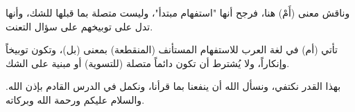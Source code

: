 وناقش  معنى (أَمْ) هنا، فرجح أنها "استفهام مبتدأ"، وليست متصلة بما قبلها للشك، وأنها تدل على توبيخهم على سؤال التعنت.

\begin{fawaid}
تأتي (أم) في لغة العرب للاستفهام المستأنف (المنقطعة) بمعنى (بل)، وتكون توبيخاً وإنكاراً، ولا يُشترط أن تكون دائماً متصلة (للتسوية) أو مبنية على الشك.
\end{fawaid}

\separator

بهذا القدر نكتفي، ونسأل الله أن ينفعنا بما قرأنا، ونكمل في الدرس القادم بإذن الله. والسلام عليكم ورحمة الله وبركاته.
